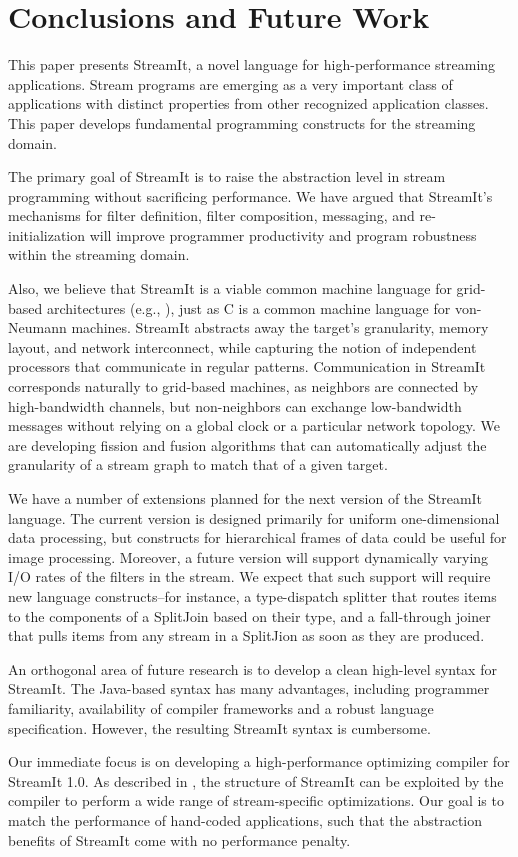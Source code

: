 \section{Conclusions and Future Work}
\label{sec:conc}

This paper presents StreamIt, a novel language for high-performance
streaming applications.  Stream programs are emerging as a very
important class of applications with distinct properties from other
recognized application classes.  This paper develops fundamental
programming constructs for the streaming domain.

The primary goal of StreamIt is to raise the abstraction level in
stream programming without sacrificing performance.  We have argued
that StreamIt's mechanisms for filter definition, filter composition,
messaging, and re-initialization will improve programmer productivity
and program robustness within the streaming domain.

Also, we believe that StreamIt is a viable common machine language for
grid-based architectures (e.g., \cite{smartmemories,raw,trips}), just
as C is a common machine language for von-Neumann machines.  StreamIt
abstracts away the target's granularity, memory layout, and network
interconnect, while capturing the notion of independent processors
that communicate in regular patterns.  Communication in StreamIt
corresponds naturally to grid-based machines, as neighbors are
connected by high-bandwidth channels, but non-neighbors can exchange
low-bandwidth messages without relying on a global clock or a
particular network topology.  We are developing fission and fusion
algorithms that can automatically adjust the granularity of a stream
graph to match that of a given target.

We have a number of extensions planned for the next version of the
StreamIt language.  The current version is designed primarily for
uniform one-dimensional data processing, but constructs for
hierarchical frames of data could be useful for image processing.
Moreover, a future version will support dynamically varying I/O rates
of the filters in the stream.  We expect that such support will
require new language constructs--for instance, a type-dispatch
splitter that routes items to the components of a SplitJoin based on
their type, and a fall-through joiner that pulls items from any stream
in a SplitJion as soon as they are produced.

An orthogonal area of future research is to develop a clean high-level
syntax for StreamIt.  The Java-based syntax has many advantages,
including programmer familiarity, availability of compiler frameworks
and a robust language specification.  However, the resulting StreamIt
syntax is cumbersome.

Our immediate focus is on developing a high-performance optimizing
compiler for StreamIt 1.0.  As described in \cite{streamittech622},
the structure of StreamIt can be exploited by the compiler to perform
a wide range of stream-specific optimizations.  Our goal is to match
the performance of hand-coded applications, such that the abstraction
benefits of StreamIt come with no performance penalty.



